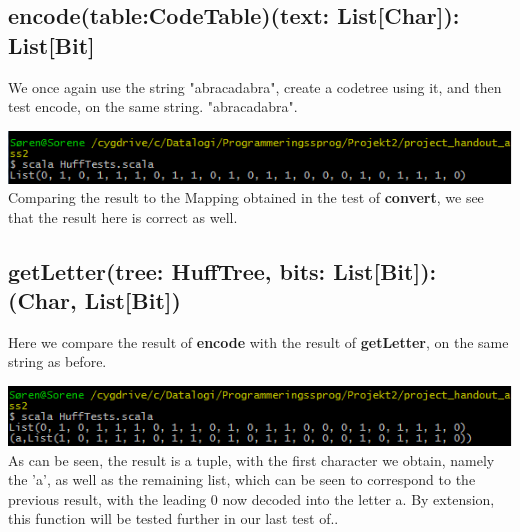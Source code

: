\documentclass{article}
\begin{document}
\subsection{encode(table:CodeTable)(text: List[Char]): List[Bit]}
We once again use the string "abracadabra", create a codetree using it, and then test encode, on the same string. "abracadabra". 

\includegraphics{test8.png}
Comparing the result to the Mapping obtained in the test of \textbf{convert}, we see that the result here is correct as well. 


\subsection{getLetter(tree: HuffTree, bits: List[Bit]): (Char, List[Bit])}
Here we compare the result of \textbf{encode} with the result of \textbf{getLetter}, on the same string as before.  

\includegraphics{test9.png}
As can be seen, the result is a tuple, with the first character we obtain, namely the 'a', as well as the remaining list, which can be seen to correspond to the previous result, with the leading 0 now decoded into the letter a. By extension, this function will be tested further in our last test of..
\end{document}
